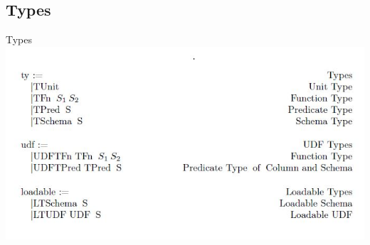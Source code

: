 \subsection{Types}
\begin{frame}{Types}
\centering
\includegraphics[scale=0.6]{Images/Grammar/Types.JPG}
\end{frame}

